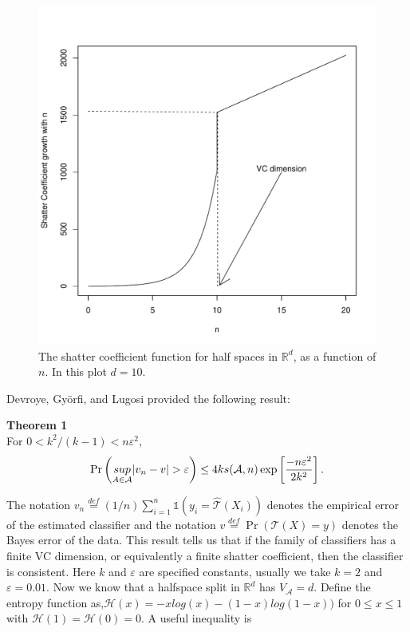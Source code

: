 \begin{figure}[h]
\centering
  \includegraphics[scale=0.7]{figures/phase_change_shatter_dynamics2.pdf}
  \caption[A shatter coefficient plot.]{The shatter coefficient function for half spaces in $\mathbb{R}^d$, as a function of $n$. In this plot $d=10$.}\label{fig:phase_change_shatter_dynamics}
\end{figure}

Devroye, Gy\"{o}rfi, and Lugosi \cite{devroye1996probabilistic} provided the following result: 

\noindent \textbf{Theorem 1}\\
For $0<k^2 /(k-1)< n\varepsilon^2$,
\begin{equation}\label{eqn:vcb}
\Pr\left(\underset{A\in \mathcal{A}}{sup} \vert v_n -v\vert > \varepsilon\right) \leq 4ks(\mathcal{A},n)\exp\vspace{-.1in}\left[\frac{-n\varepsilon^2}{2k^2}\right].
\end{equation}

The notation $v_n \overset{def}{=}(1/n)\sum_{i=1}^n\mathds{1}(y_i =\hat{\mathcal{T}}(X_i))$ denotes the empirical error of the estimated classifier and the notation $v\overset{def}{=}\Pr(\mathcal{T}(X)=y)$ denotes the Bayes error of the data. This result tells us that if the family of classifiers has a finite VC dimension, or equivalently a finite shatter coefficient, then the classifier is consistent. Here $k$ and $\varepsilon$ are specified constants, usually we take $k=2$ and $\varepsilon=0.01$. Now we know that a halfspace split in $\mathbb{R}^d$ has $V_\mathcal{A}=d$. Define the entropy function as,$\mathcal{H}(x) = -xlog(x) -(1-x)log(1-x))$ for $0 \leq x \leq 1$ with $\mathcal{H}(1)=\mathcal{H}(0)=0$. A useful inequality is 

